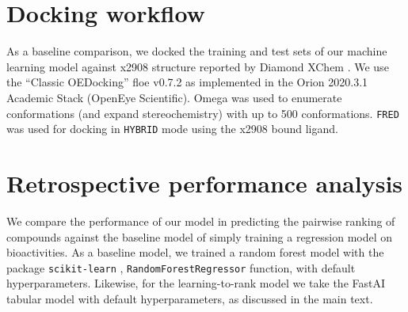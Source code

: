 \section{Docking workflow} 

As a baseline comparison, we docked the training and test sets of our machine learning model against x2908 structure reported by Diamond XChem \cite{douangamath2020crystallographic}.  We use the ``Classic OEDocking'' floe v0.7.2 as implemented in the Orion 2020.3.1 Academic Stack (OpenEye Scientific). Omega was used to enumerate conformations (and expand stereochemistry) with up to 500 conformations. \texttt{FRED} was used for docking in \texttt{HYBRID} mode using the x2908 bound ligand. 


\section{Retrospective performance analysis} 

We compare the performance of our model in predicting the pairwise ranking of compounds against the baseline model of simply training a regression model on bioactivities. As a baseline model, we trained a random forest model with the package \texttt{scikit-learn} \cite{scikit-learn}, \texttt{RandomForestRegressor} function, with default hyperparameters. Likewise, for the learning-to-rank model we take the FastAI tabular model with default hyperparameters, as discussed in the main text. 

